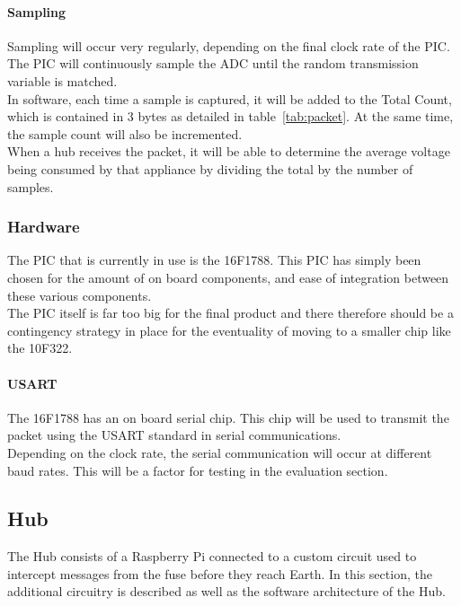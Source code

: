 \documentclass[preprint,12pt,3p]{elsarticle}
\begin{document}
\paragraph{Sampling}
Sampling will occur very regularly, depending on the final clock rate of the PIC.\\
The PIC will continuously sample the ADC until the random transmission variable is matched.\\
In software, each time a sample is captured, it will be added to the Total Count, which is contained in 3 bytes as detailed in table~\ref{tab:packet}. At the same time, the sample count will also be incremented. \\
When a hub receives the packet, it will be able to determine the average voltage being consumed by that appliance by dividing the total by the number of samples.

\subsubsection{Hardware}
The PIC that is currently in use is the 16F1788. This PIC has simply been chosen for the amount of on board components, and ease of integration between these various components.\\
The PIC itself is far too big for the final product and there therefore should be a contingency strategy in place for the eventuality of moving to a smaller chip like the 10F322.

\paragraph{USART}
The 16F1788 has an on board serial chip. This chip will be used to transmit the packet using the USART standard in serial communications.\\
Depending on the clock rate, the serial communication will occur at different baud rates. This will be a factor for testing in the evaluation section.

\subsection{Hub}
The Hub consists of a Raspberry Pi connected to a custom circuit used to intercept messages from the fuse before they reach Earth. In this section, the additional circuitry is described as well as the software architecture of the Hub.
\end{document}
